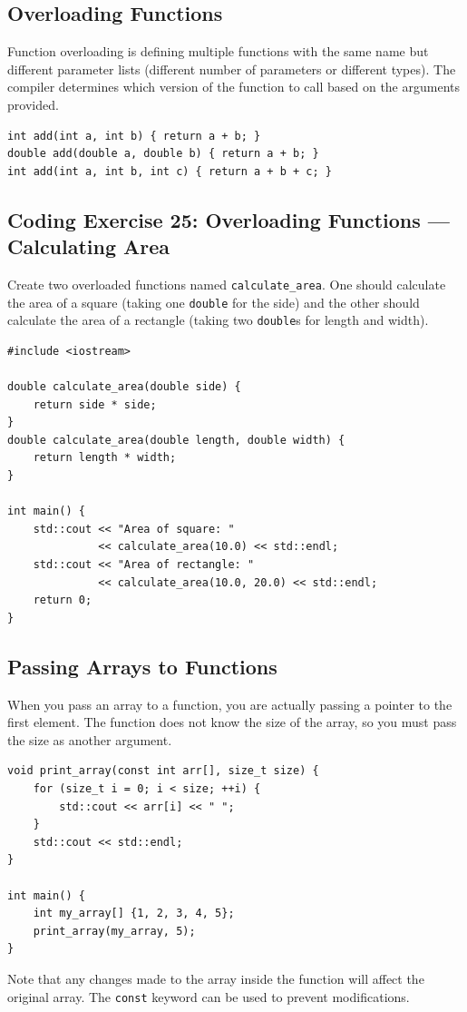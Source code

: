 \subsection{Overloading Functions}
Function overloading is defining multiple functions with the same name but different parameter lists (different number of parameters or different types). The compiler determines which version of the function to call based on the arguments provided.
\begin{lstlisting}
int add(int a, int b) { return a + b; }
double add(double a, double b) { return a + b; }
int add(int a, int b, int c) { return a + b + c; }
\end{lstlisting}

\subsection{Coding Exercise 25: Overloading Functions --- Calculating Area}
Create two overloaded functions named \texttt{calculate\_area}. One should calculate the area of a square (taking one \texttt{double} for the side) and the other should calculate the area of a rectangle (taking two \texttt{double}s for length and width).
\begin{lstlisting}
#include <iostream>

double calculate_area(double side) {
	return side * side;
}
double calculate_area(double length, double width) {
	return length * width;
}

int main() {
	std::cout << "Area of square: "
	          << calculate_area(10.0) << std::endl;
	std::cout << "Area of rectangle: "
	          << calculate_area(10.0, 20.0) << std::endl;
	return 0;
}
\end{lstlisting}

\subsection{Passing Arrays to Functions}
When you pass an array to a function, you are actually passing a pointer to the first element. The function does not know the size of the array, so you must pass the size as another argument.
\begin{lstlisting}
void print_array(const int arr[], size_t size) {
	for (size_t i = 0; i < size; ++i) {
		std::cout << arr[i] << " ";
	}
	std::cout << std::endl;
}

int main() {
	int my_array[] {1, 2, 3, 4, 5};
	print_array(my_array, 5);
}
\end{lstlisting}
\begin{remark}
Note that any changes made to the array inside the function will affect the original array. The \texttt{const} keyword can be used to prevent modifications.
\end{remark}

